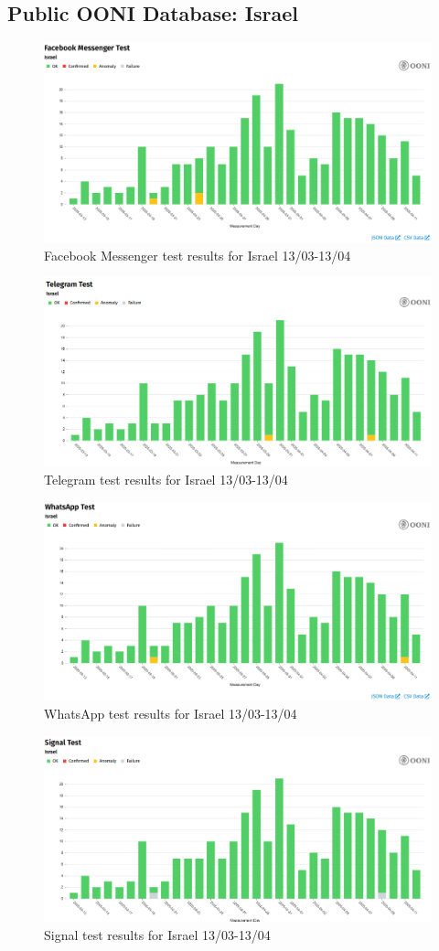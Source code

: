 \subsection{Public OONI Database: Israel}
\begin{figure} [H]
    \centering
    \includegraphics[width=0.5\linewidth]{ISROONIDBFB.png}
    \caption{Facebook Messenger test results for Israel 13/03-13/04}
    \label{fig:enter-label}
\end{figure}
\begin{figure} [H]
    \centering
    \includegraphics[width=0.5\linewidth]{ISROONIDBIM.png}
    \caption{Telegram test results for Israel 13/03-13/04}
    \label{fig:enter-label}
\end{figure}
\begin{figure} [H]
    \centering
    \includegraphics[width=0.5\linewidth]{ISROONIDBTEL.png}
    \caption{WhatsApp test results for Israel 13/03-13/04}
    \label{fig:enter-label}
\end{figure}
\begin{figure} [H]
    \centering
    \includegraphics[width=0.5\linewidth]{ISROONIDBSIG.png}
    \caption{Signal test results for Israel 13/03-13/04}
    \label{fig:enter-label}
\end{figure}


